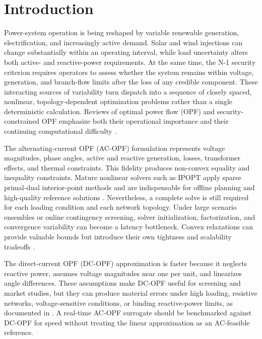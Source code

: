 \documentclass[final,5p,times,twocolumn]{elsarticle}
\begin{document}
\section{Introduction}
\label{sec:introduction}

Power-system operation is being reshaped by variable renewable generation,
electrification, and increasingly active demand. Solar and wind injections can
change substantially within an operating interval, while load uncertainty
alters both active- and reactive-power requirements. At the same time, the
N-1 security criterion requires operators to assess whether the system remains
within voltage, generation, and branch-flow limits after the loss of any
credible component. These interacting sources of variability turn dispatch
into a sequence of closely spaced, nonlinear, topology-dependent optimization
problems rather than a single deterministic calculation. Reviews of optimal
power flow (OPF) and security-constrained OPF emphasize both their operational
importance and their continuing computational difficulty
\cite{frank2016opf,capitanescu2016critical,molzahn2019survey,zohrizadeh2020conic}.

The alternating-current OPF (AC-OPF) formulation represents voltage magnitudes,
phase angles, active and reactive generation, losses, transformer effects, and
thermal constraints. This fidelity produces non-convex equality and inequality
constraints. Mature nonlinear solvers such as IPOPT apply sparse primal-dual
interior-point methods and are indispensable for offline planning and
high-quality reference solutions \cite{wachter2006ipopt}. Nevertheless, a
complete solve is still required for each loading condition and each network
topology. Under large scenario ensembles or online contingency screening,
solver initialization, factorization, and convergence variability can become a
latency bottleneck. Convex relaxations can provide valuable bounds but introduce
their own tightness and scalability tradeoffs \cite{zohrizadeh2020conic}.

The direct-current OPF (DC-OPF) approximation is faster because it neglects
reactive power, assumes voltage magnitudes near one per unit, and linearizes
angle differences. These assumptions make DC-OPF useful for screening and
market studies, but they can produce material errors under high loading,
resistive networks, voltage-sensitive conditions, or binding reactive-power
limits, as documented in \cite{stott2009dc}. A real-time AC-OPF surrogate should be
benchmarked against DC-OPF for speed without treating the linear approximation
as an AC-feasible reference.
\end{document}
